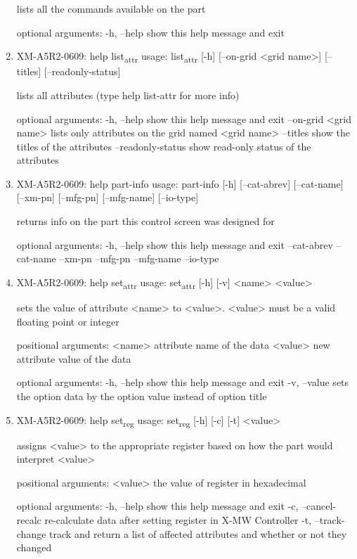 \documentclass[11pt]{article}
\begin{document}
\begin{enumerate}
lists all the commands available on the part

optional arguments:
  -h, --help  show this help message and exit

\item XM-A5R2-0609: help list\textsubscript{attr}
\label{sec:orge8a7430}
usage: list\textsubscript{attr} [-h] [--on-grid <grid name>] [--titles] [--readonly-status]

lists all attributes (type help list-attr for more info)

optional arguments:
  -h, --help            show this help message and exit
  --on-grid <grid name>
                        lists only attributes on the grid named <grid name>
  --titles              show the titles of the attributes
  --readonly-status     show read-only status of the attributes

\item XM-A5R2-0609: help part-info
\label{sec:org3472598}
usage: part-info  [-h] [--cat-abrev] [--cat-name] [--xm-pn] [--mfg-pn] [--mfg-name]
        [--io-type]

returns info on the part this control screen was designed for

optional arguments:
  -h, --help   show this help message and exit
  --cat-abrev
  --cat-name
  --xm-pn
  --mfg-pn
  --mfg-name
  --io-type

\item XM-A5R2-0609: help set\textsubscript{attr}
\label{sec:org3046dc1}
usage: set\textsubscript{attr} [-h] [-v] <name> <value>

sets the value of attribute <name> to <value>. <value> must be a valid
floating point or integer

positional arguments:
  <name>       attribute name of the data
  <value>      new attribute value of the data

optional arguments:
  -h, --help   show this help message and exit
  -v, --value  sets the option data by the option value instead of option
               title

\item XM-A5R2-0609: help set\textsubscript{reg}
\label{sec:org2fc7417}
usage: set\textsubscript{reg} [-h] [-c] [-t] <value>

assigns <value> to the appropriate register based on how the part would
interpret <value>

positional arguments:
  <value>              the value of register in hexadecimal

optional arguments:
  -h, --help           show this help message and exit
  -c, --cancel-recalc  re-calculate data after setting register in X-MW
                       Controller
  -t, --track-change   track and return a list of affected attributes and
                       whether or not they changed


\end{enumerate}
\end{document}
